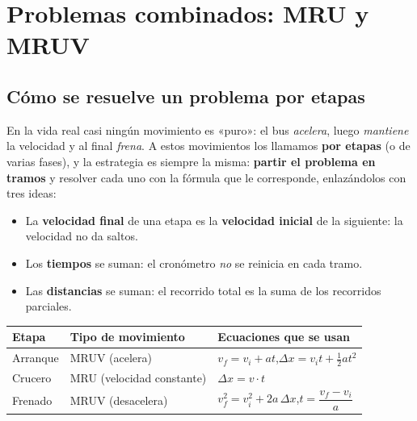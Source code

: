 \documentclass[12pt, letterpaper]{article}
\begin{document}
\section{Problemas combinados: MRU y MRUV}

\subsection{Cómo se resuelve un problema por etapas}

\begin{cuadroteoria}
  En la vida real casi ningún movimiento es «puro»: el bus \emph{acelera}, luego \emph{mantiene} la velocidad y al final \emph{frena}. A estos movimientos los llamamos \textbf{por etapas} (o de varias fases), y la estrategia es siempre la misma: \textbf{partir el problema en tramos} y resolver cada uno con la fórmula que le corresponde, enlazándolos con tres ideas:
  \begin{itemize}[leftmargin=*]
    \item La \textbf{velocidad final} de una etapa es la \textbf{velocidad inicial} de la siguiente: la velocidad no da saltos.
    \item Los \textbf{tiempos} se suman: el cronómetro \emph{no} se reinicia en cada tramo.
    \item Las \textbf{distancias} se suman: el recorrido total es la suma de los recorridos parciales.
  \end{itemize}
  \begin{center}
    \small
    \begin{tabular}{@{}l l l@{}}
      \toprule
      Etapa & Tipo de movimiento & Ecuaciones que se usan \\
      \midrule
      Arranque & MRUV (acelera) & $v_f = v_i + at$,\quad $\Delta x = v_i t + \tfrac{1}{2} a t^2$ \\
      Crucero  & MRU (velocidad constante) & $\Delta x = v \cdot t$ \\
      Frenado  & MRUV (desacelera) & $v_f^2 = v_i^2 + 2a\,\Delta x$,\quad $t = \dfrac{v_f - v_i}{a}$ \\
      \bottomrule
    \end{tabular}
  \end{center}
\end{cuadroteoria}
\end{document}
